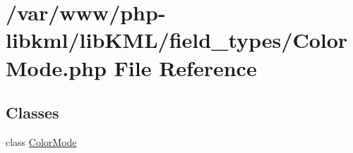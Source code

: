 \hypertarget{ColorMode_8php}{
\section{/var/www/php-\/libkml/libKML/field\_\-types/ColorMode.php File Reference}
\label{d3/dc1/ColorMode_8php}
}
\subsection*{Classes}
\begin{DoxyCompactItemize}
\item 
class \hyperlink{classColorMode}{ColorMode}
\end{DoxyCompactItemize}

